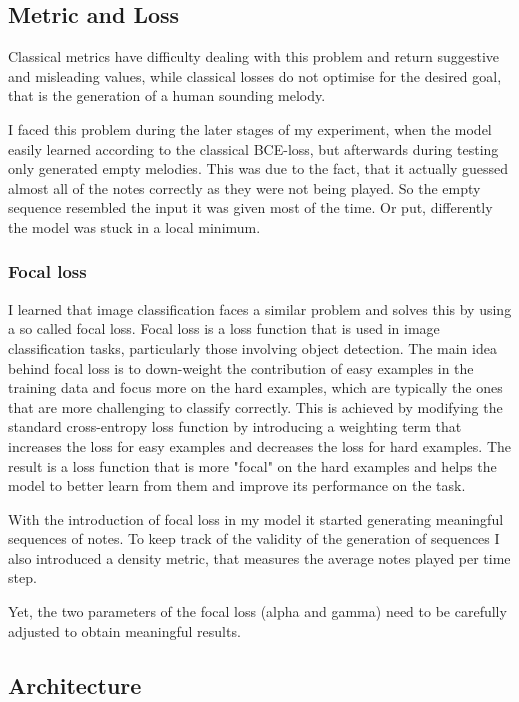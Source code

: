 \documentclass[a4paper, 10pt, xcolor=dvipsnames]{article} %
\begin{document}
\subsection{Metric and Loss}
Classical metrics have difficulty dealing with this problem and return
suggestive and misleading values, while classical losses do not optimise for
the desired goal, that is the generation of a human sounding melody.

I faced this problem during the later stages of my experiment, when the model
easily learned according to the classical BCE-loss, but afterwards during
testing only generated empty melodies. This was due to the fact, that it
actually guessed almost all of the notes correctly as they were not being
played. So the empty sequence resembled the input it was given most of the
time. Or put, differently the model was stuck in a local minimum.

\subsubsection{Focal loss}

I learned that image classification faces a similar problem and solves this by
using a so called focal loss. Focal loss is a loss function that is used in
image classification tasks, particularly those involving object detection. The
main idea behind focal loss is to down-weight the contribution of easy examples
in the training data and focus more on the hard examples, which are typically
the ones that are more challenging to classify correctly. This is achieved by
modifying the standard cross-entropy loss function by introducing a weighting
term that increases the loss for easy examples and decreases the loss for hard
examples. The result is a loss function that is more "focal" on the hard
examples and helps the model to better learn from them and improve its
performance on the task.

With the introduction of focal loss in my model it started generating
meaningful sequences of notes. To keep track of the validity of the generation
of sequences I also introduced a density metric, that measures the average
notes played per time step.

Yet, the two parameters of the focal loss (alpha and gamma) need to be
carefully adjusted to obtain meaningful results.


\subsection{Architecture}
\end{document}
